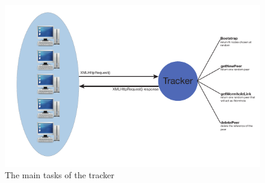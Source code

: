 \begin{figure}[ht]
  \centering
  \includegraphics[keepaspectratio=true, width=\textwidth]{images/tracker}\caption{The main tasks of the tracker}
  \label{fig:tracker}
\end{figure}
